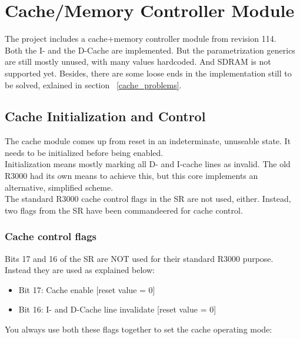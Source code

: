 \chapter{Cache/Memory Controller Module}
\label{cache}

    The project includes a cache+memory controller module from revision 114.\\
        
    Both the I- and the D-Cache are implemented. But the parametrization 
    generics are still mostly unused, with many values hardcoded. And SDRAM is 
    not supported yet. Besides, there are some loose ends in the implementation 
    still to be solved, exlained in section ~\ref{cache_problems}.\\
    
    
\section{Cache Initialization and Control}
\label{cache_init_and_control}

    The cache module comes up from reset in an indeterminate, unuseable state.
    It needs to be initialized before being enabled.\\
    Initialization means mostly marking all D- and I-cache lines as invalid. 
    The old R3000 had its own means to achieve this, but this core implements an
    alternative, simplified scheme.\\

    The standard R3000 cache control flags in the SR are not used, either. Instead,
    two flags from the SR have been commandeered for cache control.\\

\subsection{Cache control flags}
\label{cache_control_flags}
    
    Bits 17 and 16 of the SR are NOT used for their standard R3000 purpose.
    Instead they are used as explained below:
    
    \begin{itemize}
    \item Bit 17: Cache enable              [reset value = 0]
    \item Bit 16: I- and D-Cache line invalidate   [reset value = 0]
    \end{itemize}

    You always use both these flags together to set the cache operating mode:
    
